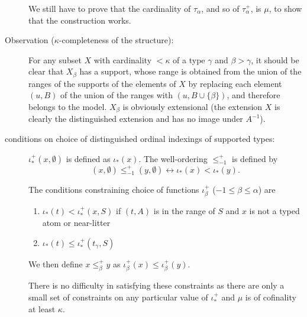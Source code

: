 \documentclass[112pt]{article}
\begin{document}
\begin{description}
We still have to prove that the cardinality of $\tau_\alpha$, and so of $\tau^+_\alpha$, is $\mu$, to show that the construction works.

\item[Observation ($\kappa$-completeness of the structure):]  For any subset $X$ with cardinality $<\kappa$ of a type $\gamma$ and $\beta>\gamma$, it should be clear that $X_\beta$ has a support, whose range is obtained from the union of the ranges of the supports of the elements of $X$  by replacing each element $(u,B)$ of the union of the ranges  with $(u,B \cup \{\beta\})$, and therefore belongs to the model.  $X_\beta$ is obviously extensional (the extension $X$ is clearly the distinguished extension and has no image under $A^{-1}$).

\item[conditions on choice of distinguished ordinal indexings of supported types:]  

$\iota_*^+(x,\emptyset)$ is defined as $\iota_*(x)$.
The well-ordering $\leq_{-1}^+$ is defined by $$(x,\emptyset) \leq_{-1}^+ (y,\emptyset) \leftrightarrow \iota_*(x) < \iota_*(y).$$

\begin{comment}

The well-ordering $\leq_\alpha^+$ of $\tau_\alpha^+$ ($\alpha \in \lambda$) must satisfy the condition that for each $(x,S) \in \tau_\alpha^+$, for each $(z,A) \in {\tt rng}(S)$ and litter $L = f_{\beta,\gamma}(y,T)$ with $\beta<\alpha$,  where $L$  meets $z$, $\iota_*^+(y,T) < \iota_*^+(x,S)$ must hold.

\end{comment}

The conditions constraining choice of functions $\iota^+_\beta$ ($-1 \leq \beta \leq \alpha$) are

\begin{enumerate}

\item $\iota_*(t) < \iota^+_*(x,S)$ if $(t,A)$ is in the range of $S$ and $x$ is not a typed atom or near-litter

\item $\iota_*(t) \leq \iota^+_*(t_\gamma,S)$

\end{enumerate}

We then define $x \leq^+_\beta y$ as $\iota^+_\beta(x) \leq \iota^+_\beta(y)$.

There is no difficulty in satisfying these constraints as there are only a small set of constraints on any particular value of $\iota_*^+$ and $\mu$ is of cofinality at least $\kappa$.


\end{description}
\end{document}
